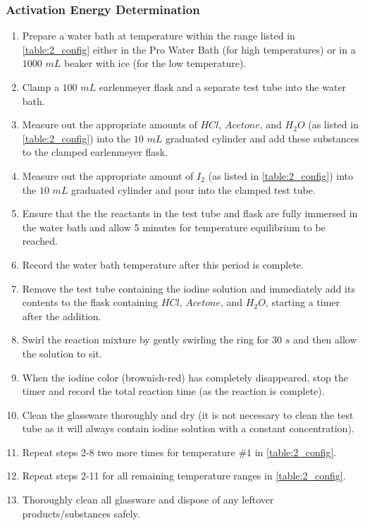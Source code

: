 \subsubsection{Activation Energy Determination}
	\begin{enumerate}[]
	  \item Prepare a water bath at temperature within the range listed in \cref{table:2_config} either in the Pro Water Bath (for high temperatures) or in a $1000$ $mL$ beaker with ice (for the low temperature).
	  \item Clamp a $100$ $mL$ earlenmeyer flask and a separate test tube into the water bath.
	  \item Measure out the appropriate amounts of $HCl$, $Acetone$, and $H_2O$ (as listed in \cref{table:2_config}) into the $10$ $mL$ graduated cylinder and add these substances to the clamped earlenmeyer flask.
	  \item Measure out the appropriate amount of $I_2$ (as listed in \cref{table:2_config}) into the $10$ $mL$ graduated cylinder and pour into the clamped test tube.
	  \item Ensure that the the reactants in the test tube and flask are fully immersed in the water bath and allow 5 minutes for temperature equilibrium to be reached.
	  \item Record the water bath temperature after this period is complete.
	  \item Remove the test tube containing the iodine solution and immediately add its contents to the flask containing $HCl$, $Acetone$, and $H_2O$, starting a timer after the addition.
	  \item Swirl the reaction mixture by gently swirling the ring for $30$ $s$ and then allow the solution to sit.
	  \item When the iodine color (brownish-red) has completely disappeared, stop the timer and record the total reaction time (as the reaction is complete).
	  \item Clean the glassware thoroughly and dry (it is not necessary to clean the test tube as it will always contain iodine solution with a constant concentration).
	  \item Repeat steps 2-8 two more times for temperature $\#1$ in \cref{table:2_config}.
	  \item Repeat steps 2-11 for all remaining temperature ranges in \cref{table:2_config}.
	  \item Thoroughly clean all glassware and dispose of any leftover products/substances safely.
	\end{enumerate}

